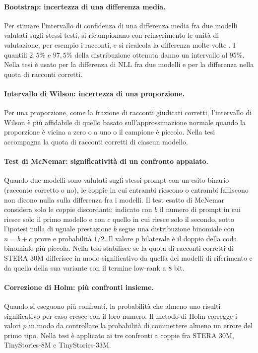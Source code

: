 \paragraph{Bootstrap: incertezza di una differenza media.} Per stimare l'intervallo di confidenza di una differenza media fra due modelli valutati sugli stessi testi, si ricampionano con reinserimento le unità di valutazione, per esempio i racconti, e si ricalcola la differenza molte volte \cite{efron1979bootstrap}. I quantili $2{,}5\%$ e $97{,}5\%$ della distribuzione ottenuta danno un intervallo al 95\%. Nella tesi è usato per la differenza di NLL fra due modelli e per la differenza nella quota di racconti corretti.

\paragraph{Intervallo di Wilson: incertezza di una proporzione.} Per una proporzione, come la frazione di racconti giudicati corretti, l'intervallo di Wilson \cite{wilson1927probable} è più affidabile di quello basato sull'approssimazione normale quando la proporzione è vicina a zero o a uno o il campione è piccolo. Nella tesi accompagna la quota di racconti corretti di ciascun modello.

\paragraph{Test di McNemar: significatività di un confronto appaiato.} Quando due modelli sono valutati sugli stessi prompt con un esito binario (racconto corretto o no), le coppie in cui entrambi riescono o entrambi falliscono non dicono nulla sulla differenza fra i modelli. Il test esatto di McNemar \cite{mcnemar1947note} considera solo le coppie discordanti: indicato con $b$ il numero di prompt in cui riesce solo il primo modello e con $c$ quello in cui riesce solo il secondo, sotto l'ipotesi nulla di uguale prestazione $b$ segue una distribuzione binomiale con $n=b+c$ prove e probabilità $1/2$. Il valore $p$ bilaterale è il doppio della coda binomiale più piccola. Nella tesi stabilisce se la quota di racconti corretti di STERA 30M differisce in modo significativo da quella dei modelli di riferimento e da quella della sua variante con il termine low-rank a 8 bit.

\paragraph{Correzione di Holm: più confronti insieme.} Quando si eseguono più confronti, la probabilità che almeno uno risulti significativo per caso cresce con il loro numero. Il metodo di Holm \cite{holm1979simple} corregge i valori $p$ in modo da controllare la probabilità di commettere almeno un errore del primo tipo. Nella tesi è applicato ai tre confronti a coppie fra STERA 30M, TinyStories-8M e TinyStories-33M.

